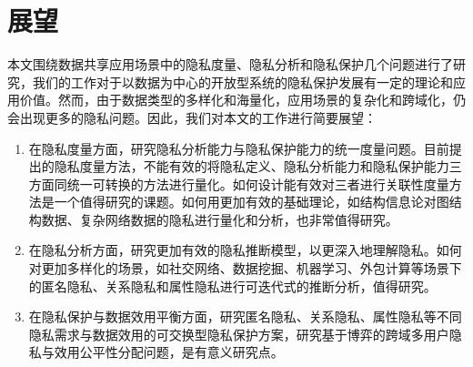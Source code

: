 \section{展望}
   本文围绕数据共享应用场景中的隐私度量、隐私分析和隐私保护几个问题进行了研究，我们的工作对于以数据为中心的开放型系统的隐私保护发展有一定的理论和应用价值。然而，由于数据类型的多样化和海量化，应用场景的复杂化和跨域化，仍会出现更多的隐私问题。因此，我们对本文的工作进行简要展望：
\begin{enumerate}
	\item 在隐私度量方面，研究隐私分析能力与隐私保护能力的统一度量问题。目前提出的隐私度量方法，不能有效的将隐私定义、隐私分析能力和隐私保护能力三方面同统一可转换的方法进行量化。如何设计能有效对三者进行关联性度量方法是一个值得研究的课题。如何用更加有效的基础理论，如结构信息论对图结构数据、复杂网络数据的隐私进行量化和分析，也非常值得研究。
	
	\item 在隐私分析方面，研究更加有效的隐私推断模型，以更深入地理解隐私。如何对更加多样化的场景，如社交网络、数据挖掘、机器学习、外包计算等场景下的匿名隐私、关系隐私和属性隐私进行可迭代式的推断分析，值得研究。
	
	\item 在隐私保护与数据效用平衡方面，研究匿名隐私、关系隐私、属性隐私等不同隐私需求与数据效用的可交换型隐私保护方案，研究基于博弈的跨域多用户隐私与效用公平性分配问题，是有意义研究点。

\end{enumerate}
